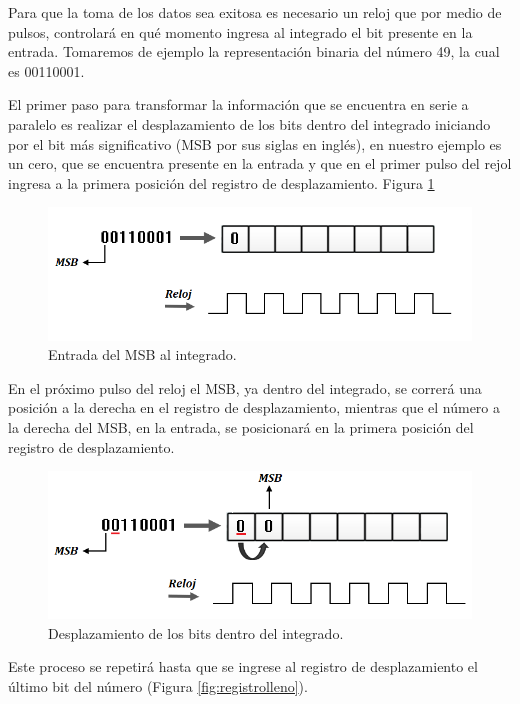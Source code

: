 \documentclass{article}
\begin{document}
Para que la toma de los datos sea exitosa es necesario un reloj que por medio de pulsos, controlará en qué momento ingresa al integrado el bit presente en la entrada. Tomaremos de ejemplo la representación binaria del número 49, la cual es 00110001.

El primer paso para transformar la información que se encuentra en serie a paralelo es realizar el desplazamiento de los bits dentro del integrado iniciando por el bit más significativo (MSB por sus siglas en inglés), en nuestro ejemplo es un cero, que se encuentra presente en la entrada y que en el primer pulso del rejol ingresa a la primera posición del registro de desplazamiento. Figura \ref{fig:MSB}

\begin{figure}[h]
\includegraphics[scale=0.8]{MSB.png}
\centering
\caption{Entrada del MSB al integrado.}
\label{fig:MSB}
\end{figure}

En el próximo pulso del reloj el MSB, ya dentro del integrado, se correrá una posición a la derecha en el registro de desplazamiento, mientras que el número a la derecha del MSB, en la entrada, se posicionará en la primera posición del registro de desplazamiento.

\newpage
\begin{figure}[h]
\includegraphics[scale=0.8]{MSB1.png}
\centering
\caption{Desplazamiento de los bits dentro del integrado.}
\label{fig:MSB1}
\end{figure}

Este proceso se repetirá hasta que se ingrese al registro de desplazamiento el último bit del número (Figura \ref{fig:registrolleno}).
\end{document}
